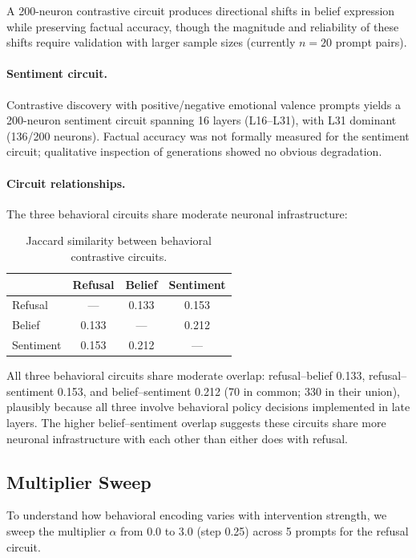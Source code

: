 \documentclass[11pt]{article}
\begin{document}
A 200-neuron contrastive circuit produces directional shifts in belief expression while preserving factual accuracy, though the magnitude and reliability of these shifts require validation with larger sample sizes (currently $n{=}20$ prompt pairs).

\paragraph{Sentiment circuit.}
Contrastive discovery with positive/negative emotional valence prompts yields a 200-neuron sentiment circuit spanning 16 layers (L16--L31), with L31 dominant (136/200 neurons).
Factual accuracy was not formally measured for the sentiment circuit; qualitative inspection of generations showed no obvious degradation.

\paragraph{Circuit relationships.}
The three behavioral circuits share moderate neuronal infrastructure:

\begin{table}[htbp]
\centering
\caption{Jaccard similarity between behavioral contrastive circuits.}
\label{tab:behavioral_overlap}
\small
\begin{tabular}{lccc}
\toprule
& \textbf{Refusal} & \textbf{Belief} & \textbf{Sentiment} \\
\midrule
Refusal & --- & 0.133 & 0.153 \\
Belief & 0.133 & --- & 0.212 \\
Sentiment & 0.153 & 0.212 & --- \\
\bottomrule
\end{tabular}
\end{table}

All three behavioral circuits share moderate overlap: refusal--belief 0.133, refusal--sentiment 0.153, and belief--sentiment 0.212 (70 in common; 330 in their union), plausibly because all three involve behavioral policy decisions implemented in late layers.
The higher belief--sentiment overlap suggests these circuits share more neuronal infrastructure with each other than either does with refusal.

\subsection{Multiplier Sweep}
\label{sec:sweep}

To understand how behavioral encoding varies with intervention strength, we sweep the multiplier $\alpha$ from 0.0 to 3.0 (step 0.25) across 5 prompts for the refusal circuit.
\end{document}
